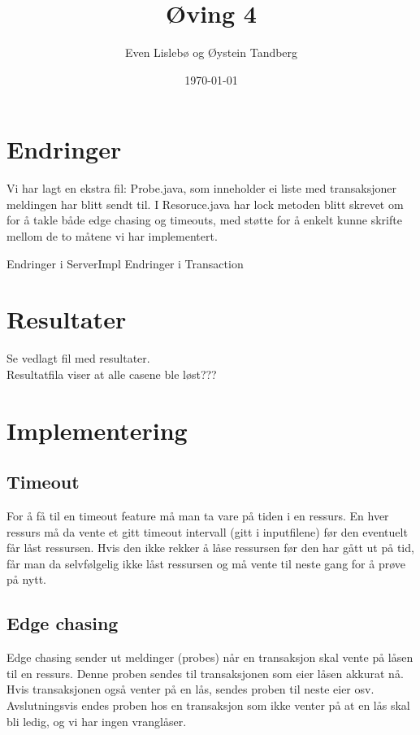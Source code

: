 \documentclass{article}
\begin{document}
\title{Øving 4}
\author{Even Lislebø og Øystein Tandberg}
\date{\today}
\maketitle

\section*{Endringer}
Vi har lagt en ekstra fil: Probe.java, som inneholder ei liste med transaksjoner meldingen har blitt sendt til.
I Resoruce.java har lock metoden blitt skrevet om for å takle både edge chasing og timeouts, med støtte for å enkelt kunne skrifte mellom de to måtene vi har implementert. 

Endringer i ServerImpl
Endringer i Transaction

\section*{Resultater}
Se vedlagt fil med resultater. \\ 
Resultatfila viser at alle casene ble løst???

\section*{Implementering}
\subsection*{Timeout}
For å få til en timeout feature må man ta vare på tiden i en ressurs. En hver ressurs må da vente et gitt timeout intervall (gitt i inputfilene) før den eventuelt får låst ressursen. Hvis den ikke rekker å låse ressursen før den har gått ut på tid, får man da selvfølgelig ikke låst ressursen og må vente til neste gang for å prøve på nytt.

\subsection*{Edge chasing}
Edge chasing sender ut meldinger (probes) når en transaksjon skal vente på låsen til en ressurs. Denne proben sendes til transaksjonen som eier låsen akkurat nå. Hvis transaksjonen også venter på en lås, sendes proben til neste eier osv. Avslutningsvis endes proben hos en transaksjon som ikke venter på at en lås skal bli ledig, og vi har ingen vranglåser.
\end{document}
